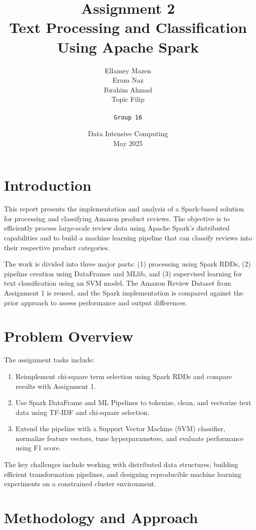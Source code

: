 \documentclass[12pt]{article}
\title{\bfseries\LARGE Assignment 2\\[0.5em]
\large Text Processing and Classification Using Apache Spark}
\author{
  \begin{tabular}{c}
    Ellamey Mazen \\
    Erum Naz \\
    Ibrahim Ahmad \\
    Topic Filip \\
    \\
    \texttt{Group 16}
  \end{tabular}
}
\date{\large Data Intensive Computing\\[0.3em]May 2025}
\begin{document}
\maketitle
\clearpage
\section{Introduction}

This report presents the implementation and analysis of a Spark-based solution for processing and classifying Amazon product reviews. The objective is to efficiently process large-scale review data using Apache Spark’s distributed capabilities and to build a machine learning pipeline that can classify reviews into their respective product categories.

The work is divided into three major parts: (1) processing using Spark RDDs, (2) pipeline creation using DataFrames and MLlib, and (3) supervised learning for text classification using an SVM model. The Amazon Review Dataset from Assignment 1 is reused, and the Spark implementation is compared against the prior approach to assess performance and output differences.


\section{Problem Overview}

The assignment tasks include:

\begin{enumerate}
  \item Reimplement chi-square term selection using Spark RDDs and compare results with Assignment 1.
  \item Use Spark DataFrame and ML Pipelines to tokenize, clean, and vectorize text data using TF-IDF and chi-square selection.
  \item Extend the pipeline with a Support Vector Machine (SVM) classifier, normalize feature vectors, tune hyperparameters, and evaluate performance using F1 score.
\end{enumerate}

The key challenges include working with distributed data structures, building efficient transformation pipelines, and designing reproducible machine learning experiments on a constrained cluster environment.

\section{Methodology and Approach}
\end{document}
